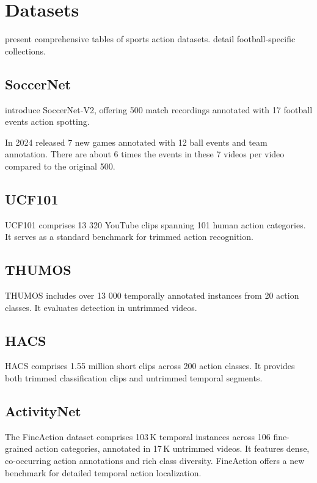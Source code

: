 \section{Datasets}
\label{sec:datasets}

\textcite{survey_of_survey} present comprehensive tables of sports action datasets. \textcite{seweryn_survey_2023} detail football‐specific collections.

\subsection{SoccerNet}

\textcite{deliege_soccernet-v2_dataset_2021} introduce SoccerNet-V2, offering 500 match recordings annotated with 17 football events action spotting.

In 2024 \textcite{deliege_soccernet-v2_dataset_2021} released 7 new games annotated with 12 ball events and team annotation. There are about 6 times the events in these 7 videos per video compared to the original 500. 

\subsection{UCF101}
UCF101 \cite{dataset:UCF101} comprises 13 320 YouTube clips spanning 101 human action categories. It serves as a standard benchmark for trimmed action recognition.

\subsection{THUMOS}
THUMOS \cite{dataset:thumos} includes over 13 000 temporally annotated instances from 20 action classes. It evaluates detection in untrimmed videos.

\subsection{HACS}
HACS \cite{dataset:hacs} comprises 1.55 million short clips across 200 action classes. It provides both trimmed classification clips and untrimmed temporal segments.

\subsection{ActivityNet}
The FineAction dataset \cite{dataset:fineaction} comprises 103\,K temporal instances across 106 fine-grained action categories, annotated in 17\,K untrimmed videos. It features dense, co-occurring action annotations and rich class diversity. FineAction offers a new benchmark for detailed temporal action localization.


